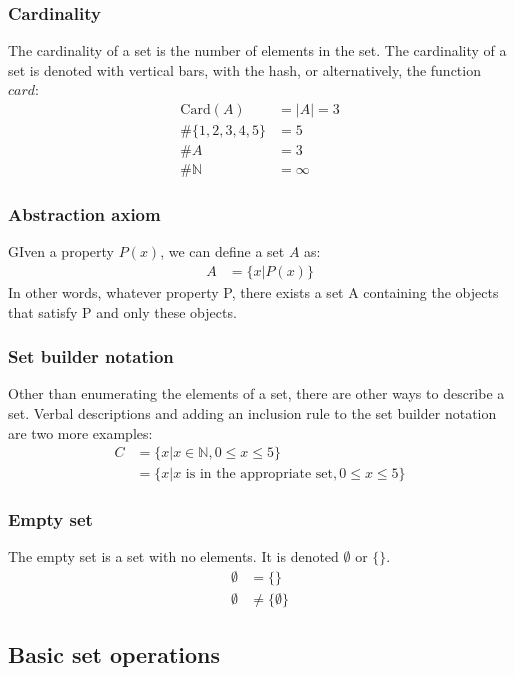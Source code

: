 \documentclass{article}
\begin{document}
\subsubsection{Cardinality}

The cardinality of a set is the number of elements in the set. The cardinality of a set is denoted with vertical bars, with the hash, or alternatively, the function $card$:
\begin{align*}
    \text{Card}(A)  & = |A| = 3 \\
    \#\{1,2,3,4,5\} & = 5       \\
    \#A             & = 3       \\  %
    \#\mathbb{N}    & = \infty
\end{align*}
\subsubsection{Abstraction axiom}
GIven a property $P(x)$, we can define a set $A$ as:
\begin{align*}
    A & = \{x | P(x)\}
\end{align*}
In other words, whatever property P, there exists a set A containing the objects that satisfy P and only these objects.

\subsubsection{Set builder notation}
Other than enumerating the elements of a set, there are other ways to describe a set. Verbal descriptions and adding an inclusion rule to the set builder notation are two more examples:
\begin{align*}
    C & = \{x | x \in \mathbb{N}, 0 \leq x \leq 5\}                    \\
      & = \{x |\text{$x$ is in the appropriate set}, 0 \leq x \leq 5\}
\end{align*}

\subsubsection{Empty set}
The empty set is a set with no elements. It is denoted $\emptyset$ or $\{\}$.
\begin{align*}
    \emptyset & = \{\}               \\
    \emptyset & \neq \{ \emptyset \}
\end{align*}

\subsection{Basic set operations}
\end{document}
